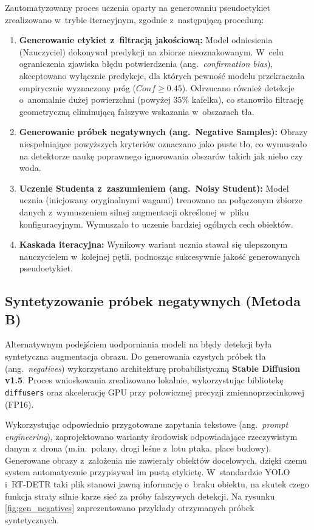 Zautomatyzowany proces uczenia oparty na generowaniu pseudoetykiet zrealizowano w~trybie iteracyjnym, zgodnie z~następującą procedurą:
\begin{enumerate}
    \item \textbf{Generowanie etykiet z~filtracją jakościową:} Model odniesienia (Nauczyciel) dokonywał predykcji na zbiorze nieoznakowanym. W~celu ograniczenia zjawiska błędu potwierdzenia (ang.\ \emph{confirmation bias}), akceptowano wyłącznie predykcje, dla których pewność modelu przekraczała empirycznie wyznaczony próg ($Conf \geq 0.45$). Odrzucano również detekcje o~anomalnie dużej powierzchni (powyżej $35\%$ kafelka), co stanowiło filtrację geometryczną eliminującą fałszywe wskazania w~obszarach tła.
    \item \textbf{Generowanie próbek negatywnych (ang.\ Negative Samples):} Obrazy niespełniające powyższych kryteriów oznaczano jako puste tło, co wymuszało na detektorze naukę poprawnego ignorowania obszarów takich jak niebo czy woda.
    \item \textbf{Uczenie Studenta z~zaszumieniem (ang.\ Noisy Student):} Model ucznia (inicjowany oryginalnymi wagami) trenowano na połączonym zbiorze danych z~wymuszeniem silnej augmentacji określonej w~pliku konfiguracyjnym. Wymuszało to uczenie bardziej ogólnych cech obiektów.
    \item \textbf{Kaskada iteracyjna:} Wynikowy wariant ucznia stawał się ulepszonym nauczycielem w~kolejnej pętli, podnosząc sukcesywnie jakość generowanych pseudoetykiet.
\end{enumerate}

\subsection{Syntetyzowanie próbek negatywnych (Metoda B)}

Alternatywnym podejściem uodporniania modeli na błędy detekcji była syntetyczna augmentacja obrazu. Do generowania czystych próbek tła (ang.\ \emph{negatives}) wykorzystano architekturę probabilistyczną \textbf{Stable Diffusion v1.5}. Proces wnioskowania zrealizowano lokalnie, wykorzystując bibliotekę \texttt{diffusers} oraz akcelerację GPU przy połowicznej precyzji zmiennoprzecinkowej (FP16).

Wykorzystując odpowiednio przygotowane zapytania tekstowe (ang.\ \emph{prompt engineering}), zaprojektowano warianty środowisk odpowiadające rzeczywistym danym z~drona (m.in.\ polany, drogi leśne z~lotu ptaka, place budowy). Generowane obrazy z~założenia nie zawierały obiektów docelowych, dzięki czemu system automatycznie przypisywał im pustą etykietę. W~standardzie YOLO i~RT-DETR taki plik stanowi jawną informację o~braku obiektu, na skutek czego funkcja straty silnie karze sieć za próby fałszywych detekcji. Na rysunku \ref{fig:gen_negatives} zaprezentowano przykłady otrzymanych próbek syntetycznych.

